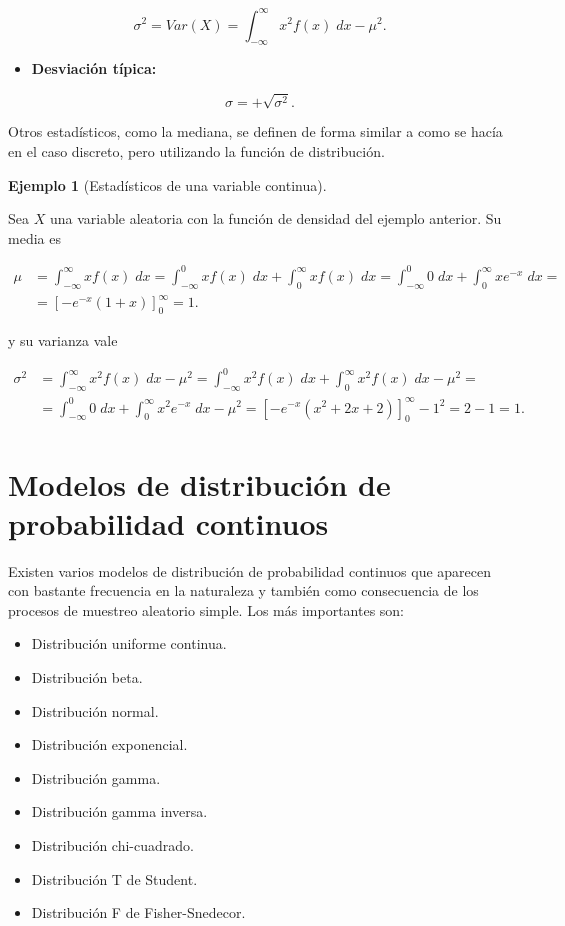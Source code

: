 \documentclass[
  spanish,
  a4paper,
]{scrreport}
\providecommand{\tightlist}{%
  \setlength{\itemsep}{0pt}\setlength{\parskip}{0pt}}
\theoremstyle{plain}
\theoremstyle{definition}
\newtheorem{example}{Ejemplo}[chapter]
\theoremstyle{definition}
\theoremstyle{remark}
\begin{document}
\[
\sigma^2 = Var(X) = \int_{-\infty}^\infty x^2 f(x)\; dx -\mu^2.
\]

\begin{itemize}
\tightlist
\item
  \textbf{Desviación típica:}
\end{itemize}

\[
\sigma = +\sqrt{\sigma^2}.
\]

Otros estadísticos, como la mediana, se definen de forma similar a como
se hacía en el caso discreto, pero utilizando la función de
distribución.

\begin{example}[Estadísticos de una variable
continua]\protect\hypertarget{exm-estadisticos-densidad-exponencial}{}\label{exm-estadisticos-densidad-exponencial}

Sea \(X\) una variable aleatoria con la función de densidad del ejemplo
anterior. Su media es

\[
\begin{aligned}
\mu &= \int_{-\infty}^\infty xf(x)\;dx = \int_{-\infty}^0 xf(x)\;dx +\int_0^\infty xf(x)\;dx = \int_{-\infty}^0 0\;dx +\int_0^\infty xe^{-x}\;dx =\\
&= \left[-e^{-x}(1+x)\right]_0^{\infty} = 1.
\end{aligned}
\]

y su varianza vale

\[
\begin{aligned}
\sigma^2 &= \int_{-\infty}^\infty x^2f(x)\;dx -\mu^2 = \int_{-\infty}^0 x^2f(x)\;dx +\int_0^\infty x^2f(x)\;dx -\mu^2 = \\
&= \int_{-\infty}^0 0\;dx +\int_0^\infty x^2e^{-x}\;dx -\mu^2= \left[-e^{-x}(x^2+2x+2)\right]_0^{\infty} - 1^2= 2-1 = 1.
\end{aligned}
\]

\end{example}

\section{Modelos de distribución de probabilidad
continuos}\label{modelos-de-distribuciuxf3n-de-probabilidad-continuos}

Existen varios modelos de distribución de probabilidad continuos que
aparecen con bastante frecuencia en la naturaleza y también como
consecuencia de los procesos de muestreo aleatorio simple. Los más
importantes son:

\begin{itemize}
\tightlist
\item
  Distribución uniforme continua.
\item
  Distribución beta.
\item
  Distribución normal.
\item
  Distribución exponencial.
\item
  Distribución gamma.
\item
  Distribución gamma inversa.
\item
  Distribución chi-cuadrado.
\item
  Distribución T de Student.
\item
  Distribución F de Fisher-Snedecor.
\end{itemize}
\end{document}
